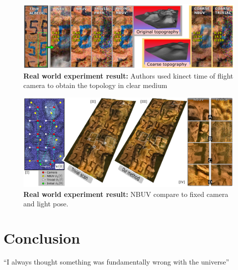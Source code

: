 \documentclass{article}
\begin{document}
\begin{figure}[h!]
\centering
\includegraphics[width=\textwidth]{NBUV_experiment_1.png}
\caption{\textbf{Real world experiment result:} Authors used kinect time of flight camera to obtain the topology in clear medium}
\label{fig:experiment_1}
\end{figure}

\begin{figure}[h!]
\centering
\includegraphics[width=\textwidth]{NBUV_experiment_2.png}
\caption{\textbf{Real world experiment result:} NBUV compare to fixed camera and light pose.}
\label{fig:experiment_2}
\end{figure}



\section{Conclusion}
``I always thought something was fundamentally wrong with the universe'' \citep{adams1995hitchhiker}



\end{document}
